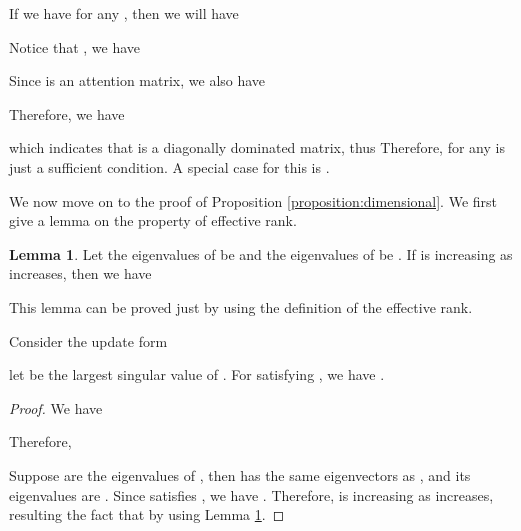 \documentclass{article}
\theoremstyle{definition}
\newenvironment{manualproposition}[1]{\renewcommand\themanualtheoreminner{#1}\manualtheoreminner
}{\endmanualtheoreminner}
\newtheorem{lemma}{Lemma}[section]
\theoremstyle{remark}
\theoremstyle{theorem}
\begin{document}
If we have  for any , then we will have

Notice that , we have

Since  is an attention matrix, we also have

Therefore, we have

which indicates that  is a diagonally dominated matrix, thus  Therefore,  for any  is just a sufficient condition. A special case for this is .

We now move on to the proof of Proposition \ref{proposition:dimensional}. We first give a lemma on the property of effective rank.
\begin{lemma}
    Let the eigenvalues of  be  and the eigenvalues of  be . If  is increasing as  increases, then we have  \label{lemma3}
\end{lemma}
This lemma can be proved just by using the definition of the effective rank.
\begin{manualproposition}{2}
Consider the update form
    
    let  be the largest singular value of . For  satisfying , we have .
\end{manualproposition}
\begin{proof}
    We have
    
    Therefore,
    
    Suppose  are the eigenvalues of , then  has the same eigenvectors as , and its eigenvalues are . Since  satisfies , we have . Therefore,  is increasing as  increases, resulting the fact that  by using Lemma \ref{lemma3}. 
\end{proof}
\end{document}
